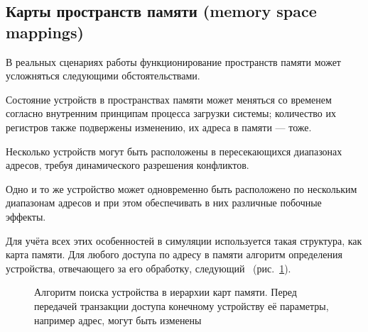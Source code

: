 \subsection[Карты пространств памяти]{Карты пространств памяти (memory space mappings)}\label{sec:mem-maps}

В реальных сценариях работы функционирование пространств памяти может усложняться следующими обстоятельствами.

\begin{itemize*}
\item Состояние устройств в пространствах памяти может меняться со временем согласно внутренним принципам процесса загрузки системы; количество их регистров также подвержены изменению, их адреса в памяти — тоже.
\item Несколько устройств могут быть расположены в пересекающихся диапазонах адресов, требуя динамического разрешения конфликтов.
\item Одно и то же устройство может одновременно быть расположено по нескольким диапазонам адресов и при этом обеспечивать в них различные побочные эффекты.
\end{itemize*}

Для учёта всех этих особенностей в симуляции используется такая структура, как карта памяти. Для любого доступа по адресу в памяти алгоритм определения устройства, отвечающего за его обработку, следующий~\cite{simics-model-builder-guide} (рис.~\ref{fig:mapalg}).

\begin{figure}[htb]
    \centering
    \caption[Алгоритм поиска устройства в иерархии карт памяти]{Алгоритм поиска устройства в иерархии карт памяти. Перед передачей транзакции доступа конечному устройству её параметры, например адрес, могут быть изменены}
    \label{fig:mapalg}
\end{figure}

